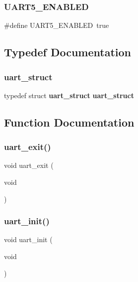 \mbox{\label{uart_8h_ad5dabee52dbd42e8b5f5d0a801fd0f2a}} 
\subsubsection{U\+A\+R\+T5\+\_\+\+E\+N\+A\+B\+L\+ED}
{\footnotesize\ttfamily \#define U\+A\+R\+T5\+\_\+\+E\+N\+A\+B\+L\+ED~true}



\subsection{Typedef Documentation}
\mbox{\label{uart_8h_a5f0e86fce871bdfd129840e6cf94520b}} 
\subsubsection{uart\+\_\+struct}
{\footnotesize\ttfamily typedef struct \textbf{ uart\+\_\+struct}  \textbf{ uart\+\_\+struct}}



\subsection{Function Documentation}
\mbox{\label{uart_8h_a7d322e20e7d34d9a8ddea6977e1a338f}} 
\subsubsection{uart\+\_\+exit()}
{\footnotesize\ttfamily void uart\+\_\+exit (\begin{DoxyParamCaption}\item[{void}]{ }\end{DoxyParamCaption})}

\mbox{\label{uart_8h_a0c0ca72359ddf28dcd15900dfba19343}} 
\subsubsection{uart\+\_\+init()}
{\footnotesize\ttfamily void uart\+\_\+init (\begin{DoxyParamCaption}\item[{void}]{ }\end{DoxyParamCaption})}

